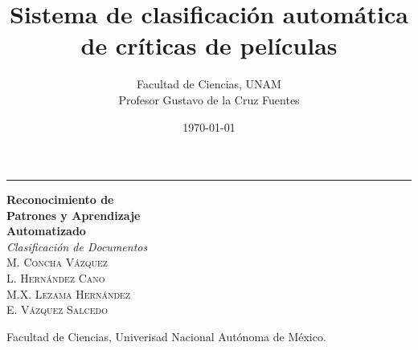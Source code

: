 \documentclass[11pt,french]{smfart}
\title{Sistema de clasificación automática de críticas de películas}
\date {\today}
\author{Facultad de Ciencias, UNAM\\ Profesor Gustavo de la Cruz Fuentes}
\begin{document}

\begin{titlepage} %
	
	\raggedleft %
	
	\rule{1pt}{\textheight} %
	\hspace{0.05\textwidth} %
	\parbox[b]{0.75\textwidth}{ %
		
		{\Huge\bfseries Reconocimiento de \\[0.4\baselineskip] Patrones y Aprendizaje  \\[0.4\baselineskip] Automatizado}\\[2\baselineskip] %
		{\large\textit{Clasificación de Documentos}}\\[3\baselineskip] %
		{\Large\textsc{M. Concha Vázquez} \\[0.1\baselineskip] \textsc{L. Hernández Cano} \\[0.1\baselineskip] \textsc{M.X. Lezama Hernández} \\[0.1\baselineskip] \textsc{E. Vázquez Salcedo} } %
		
		\vspace{0.5\textheight} %
		
		{\noindent Facultad de Ciencias, Univerisad Nacional Autónoma de México.}\\[\baselineskip] %
		
	}

\end{titlepage}




\begin{abstract}

\end{abstract}


\maketitle
\end{document}
